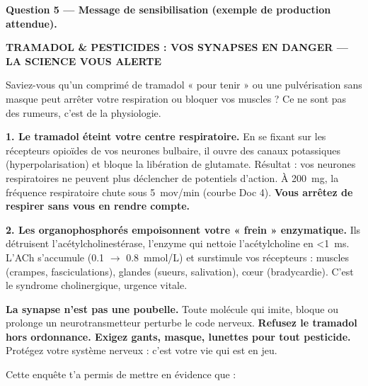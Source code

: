 \documentclass[11pt]{article}
\newcounter{popsec}
\newcounter{popsub}
\newcommand{\courssub}[1]{%
  \stepcounter{popsub}%
  \par\vspace{9pt}\noindent{\popxbold\fontsize{11.5}{13}\selectfont\color{popink}{\color{poporange}\thepopsec.\thepopsub}\hspace{6pt}#1}\par\nopagebreak\vspace{4pt}
}
\begin{document}
\begin{exoresolu}
\medskip

\textbf{Question 5 — Message de sensibilisation (exemple de production attendue).}

\begin{exemplebox}
\textbf{TRAMADOL \& PESTICIDES : VOS SYNAPSES EN DANGER — LA SCIENCE VOUS ALERTE}

Saviez-vous qu'un comprimé de tramadol « pour tenir » ou une pulvérisation sans masque peut arrêter votre respiration ou bloquer vos muscles ? Ce ne sont pas des rumeurs, c'est de la physiologie.

\textbf{1. Le tramadol éteint votre centre respiratoire.} En se fixant sur les récepteurs opioïdes de vos neurones bulbaire, il ouvre des canaux potassiques (hyperpolarisation) et bloque la libération de glutamate. Résultat : vos neurones respiratoires ne peuvent plus déclencher de potentiels d'action. À \SI{200}{mg}, la fréquence respiratoire chute sous \SI{5}{mov/min} (courbe Doc 4). \textbf{Vous arrêtez de respirer sans vous en rendre compte.}

\textbf{2. Les organophosphorés empoisonnent votre « frein » enzymatique.} Ils détruisent l'acétylcholinestérase, l'enzyme qui nettoie l'acétylcholine en \SI{<1}{ms}. L'ACh s'accumule (\num{0,1} $\to$ \SI{0,8}{mmol/L}) et surstimule vos récepteurs : muscles (crampes, fasciculations), glandes (sueurs, salivation), cœur (bradycardie). C'est le syndrome cholinergique, urgence vitale.

\textbf{La synapse n'est pas une poubelle.} Toute molécule qui imite, bloque ou prolonge un neurotransmetteur perturbe le code nerveux. \textbf{Refusez le tramadol hors ordonnance. Exigez gants, masque, lunettes pour tout pesticide.} Protégez votre système nerveux : c'est votre vie qui est en jeu.
\end{exemplebox}

\end{exoresolu}

\courssub{Bilan de l'activité}

Cette enquête t'a permis de mettre en évidence que :
\end{document}
